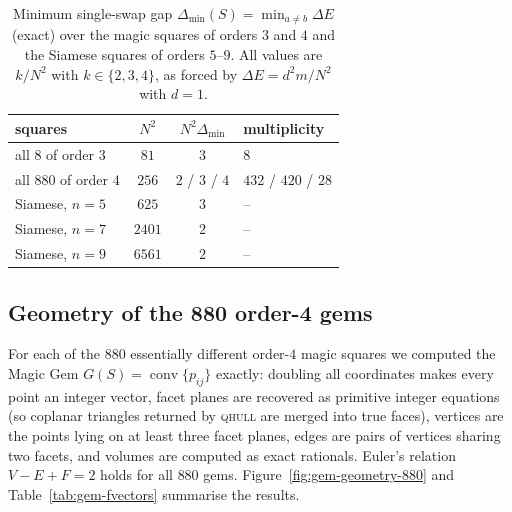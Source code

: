 \begin{table}[htbp]
\centering
\caption{Minimum single-swap gap $\Delta_{\min}(S)=\min_{a\neq b}\Delta E$
(exact) over the magic squares of orders $3$ and $4$ and the Siamese squares
of orders $5$--$9$.  All values are $k/N^2$ with $k\in\{2,3,4\}$, as forced by
$\Delta E=d^2m/N^2$ with $d=1$.}
\label{tab:min-gaps}
\begin{tabular}{lccl}
\toprule
squares & $N^2$ & $N^2\Delta_{\min}$ & multiplicity \\
\midrule
all $8$ of order $3$ & $81$ & $3$ & $8$ \\
all $880$ of order $4$ & $256$ & $2$ / $3$ / $4$ & $432$ / $420$ / $28$ \\
Siamese, $n=5$ & $625$ & $3$ & -- \\
Siamese, $n=7$ & $2401$ & $2$ & -- \\
Siamese, $n=9$ & $6561$ & $2$ & -- \\
\bottomrule
\end{tabular}
\end{table}

\subsection{Geometry of the 880 order-4 gems}
\label{sec:gem-geometry-880}

For each of the $880$ essentially different order-$4$ magic squares we
computed the Magic Gem $G(S)=\operatorname{conv}\{p_{ij}\}$ exactly: doubling
all coordinates makes every point an integer vector, facet planes are
recovered as primitive integer equations (so coplanar triangles returned by
\textsc{qhull} are merged into true faces), vertices are the points lying on
at least three facet planes, edges are pairs of vertices sharing two facets,
and volumes are computed as exact rationals.  Euler's relation $V-E+F=2$ holds
for all $880$ gems.  Figure~\ref{fig:gem-geometry-880} and
Table~\ref{tab:gem-fvectors} summarise the results.

